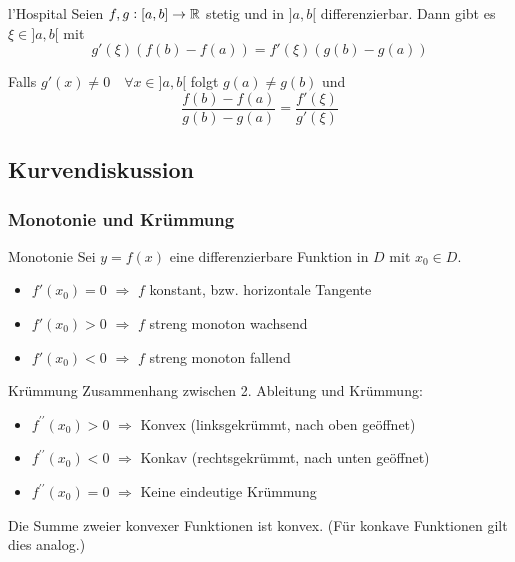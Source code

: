 \begin{theorem}{l'Hospital}
    Seien $f,g : [a,b] \to \mathbb{R}$ stetig und in $]a,b[$ differenzierbar. Dann gibt es $\xi \in ]a,b[$ mit
    $$g'(\xi)\left(f(b) - f(a)\right) = f'(\xi) \left(g(b) - g(a)\right)$$

    Falls $g'(x) \neq 0 \quad \forall x \in ]a,b[$ folgt $g(a) \neq g(b)$ und
    $$\frac{f(b) - f(a)}{g(b) - g(a)} = \frac{f'(\xi)}{g'(\xi)}$$
\end{theorem}

\subsection{Kurvendiskussion}

\subsubsection{Monotonie und Krümmung}

\begin{definition}{Monotonie}
    Sei $y=f(x)$ eine differenzierbare Funktion in $D$ mit $x_{0} \in D$.
    \begin{itemize}
        \item $f'(x_{0}) = 0$ $\Rightarrow$ $f$ konstant, bzw. horizontale Tangente
        \item $f'(x_{0}) > 0$ $\Rightarrow$ $f$ streng monoton wachsend
        \item $f'(x_{0}) < 0$ $\Rightarrow$ $f$ streng monoton fallend
    \end{itemize}
\end{definition}

\begin{theorem}{Krümmung}
    Zusammenhang zwischen 2. Ableitung und Krümmung:
    \begin{itemize}
      \item $f^{\prime \prime}\left(x_{0}\right)>0$ $\Rightarrow$ Konvex (linksgekrümmt, nach oben geöffnet)
      \item $f^{\prime \prime}\left(x_{0}\right)<0$ $\Rightarrow$ Konkav (rechtsgekrümmt, nach unten geöffnet)
      \item $f^{\prime \prime}\left(x_{0}\right)=0$ $\Rightarrow$ Keine eindeutige Krümmung
    \end{itemize}
\end{theorem}

\begin{remark}
    Die Summe zweier konvexer Funktionen ist konvex. (Für konkave Funktionen gilt dies analog.)
\end{remark}

